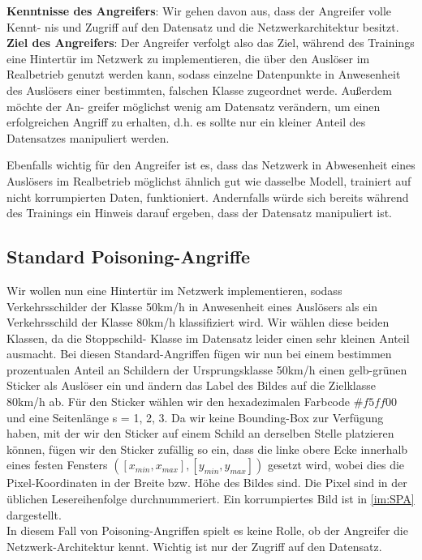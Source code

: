 \documentclass[11pt,a4paper]{article}
\numberwithin{equation}{section}
\begin{document}
	\noindent\textbf{Kenntnisse des Angreifers}: Wir gehen davon aus, dass der Angreifer volle Kennt-
	nis und Zugriff auf den Datensatz und die Netzwerkarchitektur besitzt.\\
	
	\noindent\textbf{Ziel des Angreifers}: Der Angreifer verfolgt also das Ziel, während des Trainings
	eine Hintertür im Netzwerk zu implementieren, die über den Auslöser im Realbetrieb
	genutzt werden kann, sodass einzelne Datenpunkte in Anwesenheit des Auslösers
	einer bestimmten, falschen Klasse zugeordnet werde. Außerdem möchte der An-
	greifer möglichst wenig am Datensatz verändern, um einen erfolgreichen Angriff zu
	erhalten, d.h. es sollte nur ein kleiner Anteil des Datensatzes manipuliert werden.
	
	Ebenfalls wichtig für den Angreifer ist es, dass das Netzwerk in Abwesenheit
	eines Auslösers im Realbetrieb möglichst ähnlich gut wie dasselbe Modell, trainiert auf nicht korrumpierten Daten, funktioniert. Andernfalls würde sich bereits während des
	Trainings ein Hinweis darauf ergeben, dass der Datensatz manipuliert ist.
	
	
	\subsection{Standard Poisoning-Angriffe}
	Wir wollen nun eine Hintertür im Netzwerk implementieren, sodass Verkehrsschilder
	der Klasse 50km/h in Anwesenheit eines Auslösers als ein Verkehrsschild der Klasse
	80km/h klassifiziert wird. Wir wählen diese beiden Klassen, da die Stoppschild-
	Klasse im Datensatz leider einen sehr kleinen Anteil ausmacht. Bei diesen Standard-Angriffen fügen wir nun bei einem bestimmen prozentualen Anteil an Schildern der
	Ursprungsklasse 50km/h einen gelb-grünen Sticker als Auslöser ein und ändern das
	Label des Bildes auf die Zielklasse 80km/h ab. Für den Sticker wählen wir den
	hexadezimalen Farbcode $\#f5ff00$ und eine Seitenlänge s = 1, 2, 3. Da wir keine
	Bounding-Box zur Verfügung haben, mit der wir den Sticker auf einem Schild an
	derselben Stelle platzieren können, fügen wir den Sticker zufällig so ein, dass die
	linke obere Ecke innerhalb eines festen Fensters $([x_{min}, x_{max}], [y_{min}, y_{max}])$ gesetzt
	wird, wobei dies die Pixel-Koordinaten in der Breite bzw. Höhe des Bildes sind.
	Die Pixel sind in der üblichen Lesereihenfolge durchnummeriert. Ein korrumpiertes
	Bild ist in \autoref{im:SPA} dargestellt. \\
	
	In diesem Fall von Poisoning-Angriffen spielt es keine Rolle, ob der Angreifer die Netzwerk-Architektur kennt. Wichtig ist nur der Zugriff auf den Datensatz.
	
\end{document}
